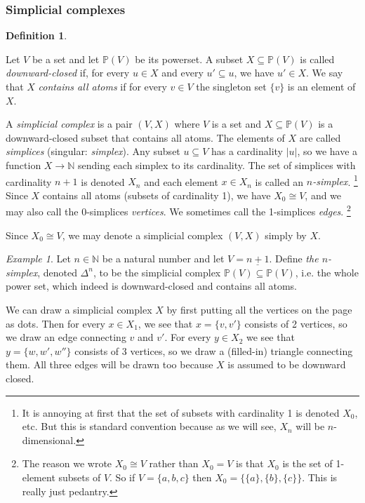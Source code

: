 \documentclass{book}
\def\PP{{\mathbb P}}
\def\NN{{\mathbb N}}
\def\to{\rightarrow}
\def\ss{\subseteq}
\def\iso{\cong}
\def\ul{\underline}
\theoremstyle{remark}
\newtheorem{example}[subsubsection]{Example}
\theoremstyle{definition}
\newtheorem{definition}[subsubsection]{Definition}
\begin{document}

\subsubsection{Simplicial complexes}\label{sec:simplicial complex}

\begin{definition}\label{def:simplicial complex}

Let $V$ be a set and let $\PP(V)$ be its powerset. A subset $X\ss\PP(V)$ is called {\em downward-closed} if, for every $u\in X$ and every $u'\ss u$, we have $u'\in X$. We say that $X$ {\em contains all atoms} if for every $v\in V$ the singleton set $\{v\}$ is an element of $X$. 

A {\em simplicial complex} is a pair $(V,X)$ where $V$ is a set and $X\ss\PP(V)$ is a downward-closed subset that contains all atoms. The elements of $X$ are called {\em simplices} (singular: {\em simplex}). Any subset $u\ss V$ has a cardinality $|u|$, so we have a function $X\to\NN$ sending each simplex to its cardinality. The set of simplices with cardinality $n+1$ is denoted $X_n$ and each element $x\in X_n$ is called an {\em $n$-simplex}.
\footnote{It is annoying at first that the set of subsets with cardinality 1 is denoted $X_0$, etc. But this is standard convention because as we will see, $X_n$ will be $n$-dimensional.}
Since $X$ contains all atoms (subsets of cardinality 1), we have $X_0\iso V$, and we may also call the 0-simplices {\em vertices}. We sometimes call the 1-simplices {\em edges}.
\footnote{The reason we wrote $X_0\iso V$ rather than $X_0=V$ is that $X_0$ is the set of 1-element subsets of $V$. So if $V=\{a,b,c\}$ then $X_0=\{\{a\},\{b\},\{c\}\}$. This is really just pedantry.}

Since $X_0\iso V$, we may denote a simplicial complex $(V,X)$ simply by $X$.

\end{definition}

\begin{example}

Let $n\in\NN$ be a natural number and let $V=\ul{n+1}$. Define {\em the $n$-simplex}, denoted $\Delta^n$, to be the simplicial complex $\PP(V)\ss\PP(V)$, i.e. the whole power set, which indeed is downward-closed and contains all atoms. 

\end{example}


We can draw a simplicial complex $X$ by first putting all the vertices on the page as dots. Then for every $x\in X_1$, we see that $x=\{v,v'\}$ consists of 2 vertices, so we draw an edge connecting $v$ and $v'$. For every $y\in X_2$ we see that $y=\{w,w',w''\}$ consists of 3 vertices, so we draw a (filled-in) triangle connecting them. All three edges will be drawn too because $X$ is assumed to be downward closed.
\end{document}
